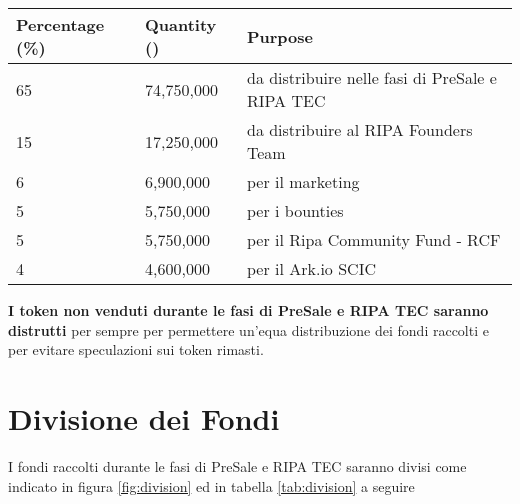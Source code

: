 \vspace{5mm}
	\label{fig:distribution}

\vspace{5mm}
\begin{table}[H]
	\centering
	\begin{tabular}{l l l}
		\toprule
		\textbf{Percentage (\%)} & \textbf{Quantity (\PHP)} & \textbf{Purpose} \\
		\midrule
		65		& 74,750,000	& da distribuire nelle fasi di PreSale e RIPA TEC	\\
		15      & 17,250,000	& da distribuire al RIPA Founders Team	\\
		6       & 6,900,000		& per il marketing	\\
		5       & 5,750,000 	& per i bounties	\\
		5       & 5,750,000		& per il Ripa Community Fund - RCF	\\
		4       & 4,600,000		& per il Ark.io SCIC \\
		\bottomrule
	\end{tabular}
	\label{tab:distribution}
\end{table}

\vspace{5mm}
\textbf{I token non venduti durante le fasi di PreSale e RIPA TEC saranno distrutti} per sempre per permettere
un'equa distribuzione dei fondi raccolti e per evitare speculazioni sui token rimasti.

\section{Divisione dei Fondi}
I fondi raccolti durante le fasi di PreSale e RIPA TEC saranno divisi come indicato in figura \ref{fig:division} 
ed in tabella \ref{tab:division} a seguire

\vspace{5mm}
\label{fig:division}


